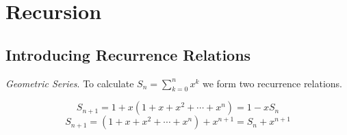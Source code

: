 
\chapter{Recursion}





\section{Introducing Recurrence Relations}

\begin{example}
\textit{Geometric Series}. 
To calculate $S_n = \sum^n_{k=0} x^k$ we form two recurrence relations.

$$ S_{n+1} = 1 + x(1 + x + x^2 + \cdots + x^n) = 1 - xS_n$$
$$ S_{n+1} = (1 + x + x^2 + \cdots + x^n) + x^{n+1} = S_n + x^{n+1}$$



\end{example}






